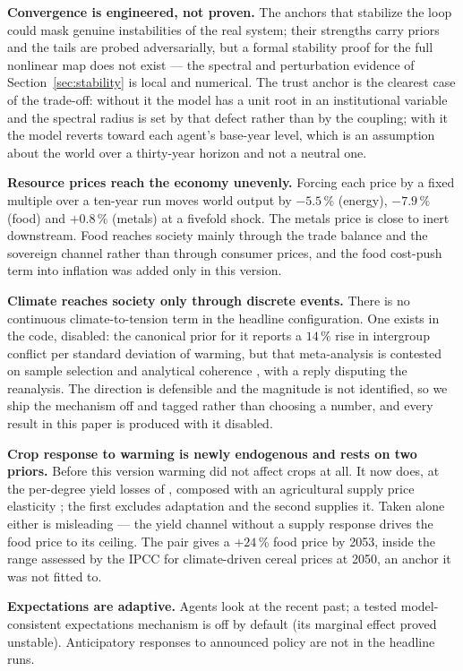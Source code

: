 \documentclass[a4paper,fleqn]{cas-sc}
\begin{document}
\textbf{Convergence is engineered, not proven.} The anchors that stabilize the loop could mask
genuine instabilities of the real system; their strengths carry priors and the tails are probed
adversarially, but a formal stability proof for the full nonlinear map does not exist --- the
spectral and perturbation evidence of Section~\ref{sec:stability} is local and numerical. The
trust anchor is the clearest case of the trade-off: without it the model has a unit root in an
institutional variable and the spectral radius is set by that defect rather than by the coupling;
with it the model reverts toward each agent's base-year level, which is an assumption about the
world over a thirty-year horizon and not a neutral one.

\textbf{Resource prices reach the economy unevenly.} Forcing each price by a fixed multiple over
a ten-year run moves world output by $-5.5\,\%$ (energy), $-7.9\,\%$ (food) and $+0.8\,\%$
(metals) at a fivefold shock. The metals price is close to inert downstream. Food reaches society
mainly through the trade balance and the sovereign channel rather than through consumer prices,
and the food cost-push term into inflation was added only in this version.

\textbf{Climate reaches society only through discrete events.} There is no continuous
climate-to-tension term in the headline configuration. One exists in the code, disabled: the
canonical prior for it \citep{hsiang2013} reports a $14\,\%$ rise in intergroup conflict per
standard deviation of warming, but that meta-analysis is contested on sample selection and
analytical coherence \citep{buhaug2014}, with a reply disputing the reanalysis. The direction is
defensible and the magnitude is not identified, so we ship the mechanism off and tagged rather
than choosing a number, and every result in this paper is produced with it disabled.

\textbf{Crop response to warming is newly endogenous and rests on two priors.} Before this
version warming did not affect crops at all. It now does, at the per-degree yield losses of
\citet{zhao2017}, composed with an agricultural supply price elasticity \citep{haile2016}; the
first excludes adaptation and the second supplies it. Taken alone either is misleading --- the
yield channel without a supply response drives the food price to its ceiling. The pair gives a
$+24\,\%$ food price by 2053, inside the range assessed by the IPCC for climate-driven cereal
prices at 2050, an anchor it was not fitted to.

\textbf{Expectations are adaptive.} Agents look at the recent past; a tested model-consistent
expectations mechanism is off by default (its marginal effect proved unstable). Anticipatory
responses to announced policy are not in the headline runs.
\end{document}
